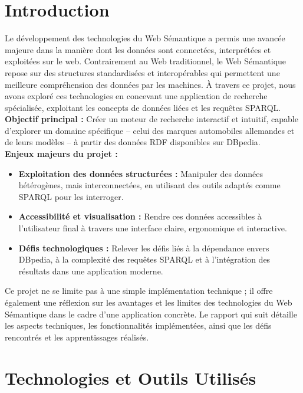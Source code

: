 \documentclass[a4paper]{article}
\begin{document}
\section{Introduction}
Le développement des technologies du Web Sémantique a permis une avancée majeure dans la manière dont les données sont connectées, interprétées et exploitées sur le web. Contrairement au Web traditionnel, le Web Sémantique repose sur des structures standardisées et interopérables qui permettent une meilleure compréhension des données par les machines. À travers ce projet, nous avons exploré ces technologies en concevant une application de recherche spécialisée, exploitant les concepts de données liées et les requêtes SPARQL. \\

\noindent
\textbf{Objectif principal :}
Créer un moteur de recherche interactif et intuitif, capable d'explorer un domaine spécifique – celui des marques automobiles allemandes et de leurs modèles – à partir des données RDF disponibles sur DBpedia. \\

\noindent
\textbf{Enjeux majeurs du projet :}
\begin{itemize}
    \item \textbf{Exploitation des données structurées :} Manipuler des données hétérogènes, mais interconnectées, en utilisant des outils adaptés comme SPARQL pour les interroger.
    \item \textbf{Accessibilité et visualisation :} Rendre ces données accessibles à l'utilisateur final à travers une interface claire, ergonomique et interactive.
    \item \textbf{Défis technologiques :} Relever les défis liés à la dépendance envers DBpedia, à la complexité des requêtes SPARQL et à l'intégration des résultats dans une application moderne.
\end{itemize}

Ce projet ne se limite pas à une simple implémentation technique ; il offre également une réflexion sur les avantages et les limites des technologies du Web Sémantique dans le cadre d'une application concrète. Le rapport qui suit détaille les aspects techniques, les fonctionnalités implémentées, ainsi que les défis rencontrés et les apprentissages réalisés.

\section{Technologies et Outils Utilisés}
\end{document}
